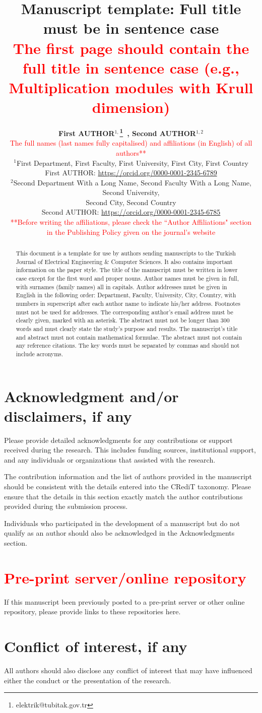 \documentclass{elektr}
\title{
Manuscript template: Full title must be in sentence case \\
\textcolor{red}{\footnotesize The first page should contain the full title in sentence case (e.g., Multiplication modules with Krull dimension)}
}
\author[AUTHOR and AUTHOR]{
	\textbf{First AUTHOR$^{1,}$\thanks{elektrik@tubitak.gov.tr}~, Second AUTHOR$^{1,2}$}\\
	\textcolor{red}{The full names (last names fully capitalised) and affiliations (in English) of all authors**}\\ 
	$^{1}$First Department, First Faculty, First University, First City, First Country\\ 	First AUTHOR: \url{https://orcid.org/0000-0001-2345-6789} \\
	$^{2}$Second Department With a Long Name, Second Faculty With a Long Name, Second University,\\ Second City, Second Country\\ Second AUTHOR: \url{https://orcid.org/0000-0001-2345-6785}\\
	\textcolor{red}{**Before writing the affiliations, please check the ``Author Affiliations" section}\\ 
	\textcolor{red}{in the Publishing Policy given on the journal’s website}\\ [1.8em]

\rec{...}
\acc{...}
\finv{...}
}
\begin{document}
	
	\maketitle
	
	
	\begin{abstract}
		This document is a template for use by authors sending manuscripts to the Turkish Journal of Electrical Engineering {\&} Computer Sciences. It also contains important information on the paper style. The title of the manuscript must be written in lower case except for the first word and proper nouns. Author names must be given in full, with surnames (family names) all in capitals. Author addresses must be given in English in the following order: Department, Faculty, University, City, Country, with numbers in superscript after each author name to indicate his/her address. Footnotes must not be used for addresses. The corresponding author's email address must be clearly given, marked with an asterisk. The abstract must not be longer than 300 words and must clearly state the study's purpose and results. The manuscript's title and abstract must not contain mathematical formulae. The abstract must not contain any reference citations. The key words must be separated by commas and should not include acronyms.
		
	\end{abstract}
	
\section*{Acknowledgment and/or disclaimers, if any}
Please provide detailed acknowledgments for any contributions or support received during the research. This includes funding sources, institutional support, and any individuals or organizations that assisted with the research. 

The contribution information and the list of authors provided in the manuscript should be consistent with the details entered into the CRediT taxonomy. Please ensure that the details in this section exactly match the author contributions provided during the submission process.

Individuals who participated in the development of a manuscript but do not qualify as an author should also be acknowledged in the Acknowledgments section.

\section*{\textcolor{red}{Pre-print server/online repository}}
If this manuscript been previously posted to a pre-print server or other online repository, please provide links to these repositories here.  

\section*{Conflict of interest, if any}
All authors should also disclose any conflict of interest that may have influenced either the conduct or the presentation of the research.
\end{document}
